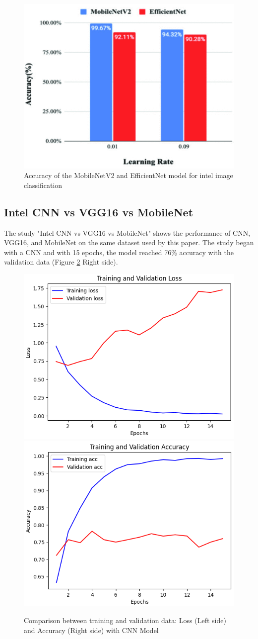 \documentclass[conference]{IEEEtran}
\begin{document}
\begin{figure}[H]
    \centering
    \includegraphics[width=0.8\linewidth]{images/stateOfTheArt/efficientVSMobileNetV2.png}
    \caption{Accuracy of the MobileNetV2 and EfficientNet model for intel image classification \cite{MobileNet_EfficientNet}}
    \label{fig:efficient_mobile}
\end{figure}

\subsection{Intel CNN vs VGG16 vs MobileNet}

The study "Intel CNN vs VGG16 vs MobileNet" \cite{web:CNN_VGG16_MobileNet:2024} shows the performance of CNN, VGG16, and MobileNet on the same dataset used by this paper. The study began with a CNN and with 15 epochs, the model reached 76\% accuracy with the validation data (Figure \ref{fig:CNN} Right side). 

\begin{figure}[H]
    \centering
    \includegraphics[width=0.45\linewidth]{images/stateOfTheArt/CNNLoss1.png}
    \quad
    \includegraphics[width=0.45\linewidth]{images/stateOfTheArt/CNNAccuracy1.png}
    \caption{Comparison between training and validation data: Loss (Left side) and Accuracy (Right side) with CNN Model \cite{web:CNN_VGG16_MobileNet:2024}}
    \label{fig:CNN}
\end{figure}
\end{document}
